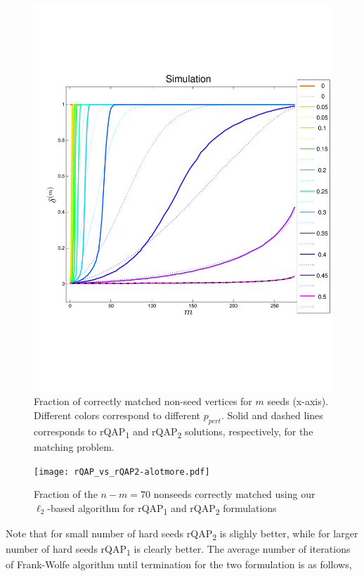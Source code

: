 \documentclass[12pt,oneside,final]{thesis}
\begin{document}
\begin{figure}
 \centering
  \caption{ Fraction of correctly matched non-seed vertices for $m$ seeds (x-axis). Different colors correspond to different  $p_{pert}$. Solid and dashed lines corresponds to rQAP\textsubscript{1} and rQAP\textsubscript{2} solutions, respectively, for the matching problem.
 \label{rqap2}}
 \includegraphics[width=1.2\textwidth]{sim_bitflip_rqap2_300_hsv.pdf}
\end{figure}

\begin{figure}
 \centering
  \caption{Fraction of the $n-m=70$ nonseeds correctly matched using our $\ell_2$-based algorithm for rQAP\textsubscript{1} and rQAP\textsubscript{2} formulations
 \label{figell2}}
 \texttt{[image: rQAP\_vs\_rQAP2-alotmore.pdf]}
\end{figure}
Note that for small number of hard seeds rQAP\textsubscript{2} is slighly better, while for larger number of hard seeds rQAP\textsubscript{1} is clearly better. The average number of iterations of Frank-Wolfe algorithm until termination for the two formulation is as follows,
\end{document}
